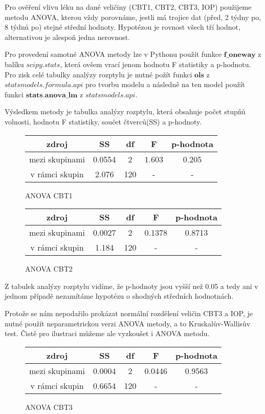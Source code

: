 \documentclass{article}
\begin{document}
Pro ověření vlivu léku na dané veličiny (CBT1, CBT2, CBT3, IOP) použijeme metodu ANOVA, kterou vždy porovnáme,
jestli má trojice dat (před, 2 týdny po, 8 týdnů po) stejné střední hodnoty.
Hypotézou je rovnost všech tří hodnot, alternativou je alespoň jedna nerovnost.

Pro provedení samotné ANOVA metody lze v Pythonu použít funkce $\mathbf{f\_oneway}$ z balíku $scipy.stats$, která ovšem vrací jenom
hodnotu F statistiky a p-hodnotu.
Pro zisk celé tabulky analýzy rozptylu je nutné požít funkci $\mathbf{ols}$ z $statsmodels.formula.api$ pro tvorbu modelu
a následně na ten model použít funkci $\mathbf{stats.anova\_lm}$ z $statsmodels.api$.

Výsledkem metody je tabulka analýzy rozptylu, která obsahuje počet stupňů volnosti, hodnotu F statistiky, součet čtverců(SS)
a p-hodnoty.

\begin{figure}[H]
  \centering
    \begin{tabular}{|ccccc|}
      \hline
      zdroj & SS & df & F & p-hodnota \\
      \hline
      mezi skupinami & 0.0554 & 2 & 1.603 & 0.205 \\
      v rámci skupin & 2.076 & 120 & - & - \\
      \hline
    \end{tabular}
    \caption{ANOVA CBT1}
\end{figure}
    

\begin{figure}[H]
  \centering
    \begin{tabular}{|ccccc|}
      \hline
      zdroj & SS & df & F & p-hodnota \\
      \hline
      mezi skupinami & 0.0027 & 2 & 0.1378 & 0.8713 \\
      v rámci skupin & 1.184 & 120 & - & - \\
      \hline
    \end{tabular}
    \caption{ANOVA CBT2}
\end{figure}

Z tabulek analýzy rozptylu vidíme, že p-hodnoty jsou vyšší než 0.05 a tedy ani v jednom případě nezamítáme hypotézu o shodných středních hodnotnách.

Protože se nám nepodařilo prokázat normální rozdělení veličin CBT3 a IOP, je nutné použít neparametrickou verzi ANOVA metody, a to Kruskalův-Wallisův test. 
Čistě pro ilustraci můžeme ale vyzkoušet i ANOVA metodu.

\begin{figure}[H]
  \centering
    \begin{tabular}{|ccccc|}
      \hline
      zdroj & SS & df & F & p-hodnota \\
      \hline
      mezi skupinami & 0.0004 & 2 & 0.0446 & 0.9563 \\
      v rámci skupin & 0.6654 & 120 & - & - \\
      \hline
    \end{tabular}
    \caption{ANOVA CBT3}
\end{figure}
\end{document}
